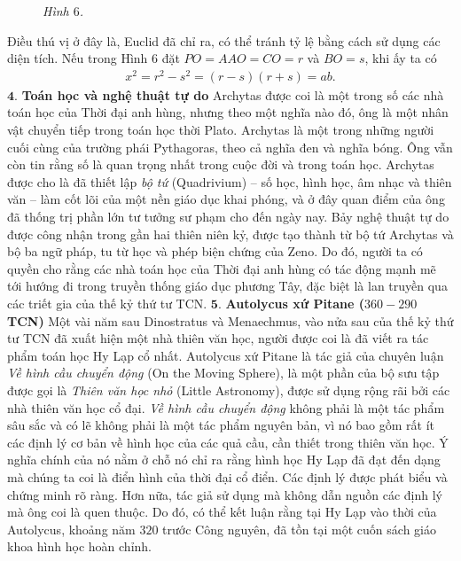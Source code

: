 \begin{multicols}{2}
\begin{figure}[H]
		\caption{\small\textit{\color{lichsutoanhoc}Hình $6$.}}
		\vspace*{-10pt}
	\end{figure}
	Điều thú vị ở đây là, Euclid đã chỉ ra, có thể tránh tỷ lệ bằng cách sử dụng các diện tích.
	\vskip 0.1cm
	Nếu trong Hình $6$ đặt $PO = AAO = CO =r$  và $BO = s$,  khi ấy ta có 
	\begin{align*}
		x^2 = r^2 - s^2 = (r-s)(r+s) = ab.
	\end{align*}
	$\pmb{4.}$ \textbf{\color{lichsutoanhoc}Toán học và nghệ thuật tự do} 
	\vskip 0.1cm
	Archytas được coi là một trong số các nhà toán học của Thời đại anh hùng, nhưng theo một nghĩa nào đó, ông là một nhân vật chuyển tiếp trong toán học thời Plato. 
	\vskip 0.1cm
	Archytas là một trong những người cuối cùng của trường phái Pythagoras, theo cả nghĩa đen và nghĩa bóng. Ông vẫn còn tin rằng số là quan trọng nhất trong cuộc đời và trong toán học.
	\vskip 0.1cm 
	Archytas được cho là đã thiết lập \textit{bộ tứ} (Quadrivium) -- số học, hình học, âm nhạc và thiên văn -- làm cốt lõi của một nền giáo dục khai phóng, và ở đây quan điểm của ông đã thống trị phần lớn tư tưởng sư phạm cho đến ngày nay.
	\vskip 0.1cm
	Bảy nghệ thuật tự do được công nhận trong gần hai thiên niên kỷ, được tạo thành từ bộ tứ Archytas và bộ ba ngữ pháp, tu từ học và phép biện chứng của Zeno. Do đó, người ta có quyền cho rằng các nhà toán học của Thời đại anh hùng có tác động mạnh mẽ tới hướng đi trong truyền thống giáo dục phương Tây, đặc biệt là lan truyền qua các triết gia của thế kỷ thứ tư TCN.
	\vskip 0.1cm
	$\pmb{5.}$ \textbf{\color{lichsutoanhoc}Autolycus xứ Pitane ($360-290$ TCN)}
	\vskip 0.1cm
	Một vài năm sau Dinostratus và Menaechmus, vào nửa sau của thế kỷ thứ tư TCN đã xuất hiện một nhà thiên văn học, người được coi là đã viết ra tác phẩm toán học Hy Lạp cổ nhất. 
	\vskip 0.1cm
	Autolycus xứ Pitane là tác giả của chuyên luận \textit{Về hình cầu chuyển động} (On the Moving Sphere), là một phần của bộ sưu tập được gọi là \textit{Thiên văn học nhỏ} (Little Astronomy), được sử dụng rộng rãi bởi các nhà thiên văn học cổ đại. \textit{Về hình cầu chuyển động} không phải là một tác phẩm sâu sắc và có lẽ không phải là một tác phẩm nguyên bản, vì nó bao gồm rất ít các định lý cơ bản về hình học của các quả cầu, cần thiết trong thiên văn học. Ý nghĩa chính của nó nằm ở chỗ nó chỉ ra rằng hình học Hy Lạp đã đạt đến dạng mà chúng ta coi là điển hình của thời đại cổ điển. Các định lý được phát biểu và chứng minh rõ ràng. Hơn nữa, tác giả sử dụng mà không  dẫn nguồn các định lý mà ông coi là quen thuộc. Do đó, có thể kết luận rằng tại Hy Lạp vào thời của Autolycus, khoảng năm $320$ trước Công nguyên, đã tồn tại một cuốn sách giáo khoa hình học hoàn chỉnh. 

\end{multicols}
